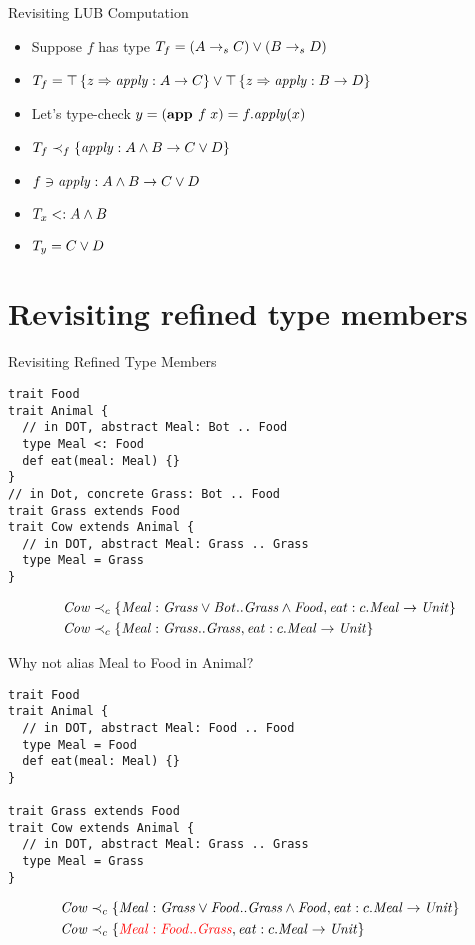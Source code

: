 \documentclass{beamer}
\begin{document}
\begin{frame}[fragile]{Revisiting LUB Computation}
\begin{itemize}
\item Suppose $f$ has type ${T_f} = {(A\rightarrow_sC)} \vee {(B\rightarrow_sD)}$
\item $T_f = {\top \left\{z \Rightarrow \mathit{apply} : A \rightarrow C \right\}} \vee {\top\left\{z \Rightarrow \mathit{apply} : B \rightarrow D \right\}}$
\item Let's type-check $y = (\textbf{app }f\;x) = f.\mathit{apply}(x)$
\item $T_f \prec_f \{\mathit{apply} : A \wedge B \rightarrow C \vee D\}$
\item $f \ni {\mathit{apply} : A \wedge B \rightarrow C \vee D}$
\item $T_x <: A \wedge B$
\item $T_y = C \vee D$
\end{itemize}
\end{frame}

\section{Revisiting refined type members}

\begin{frame}[fragile]{Revisiting Refined Type Members}
\begin{verbatim}
trait Food
trait Animal {
  // in DOT, abstract Meal: Bot .. Food
  type Meal <: Food
  def eat(meal: Meal) {}
}
// in Dot, concrete Grass: Bot .. Food
trait Grass extends Food
trait Cow extends Animal {
  // in DOT, abstract Meal: Grass .. Grass
  type Meal = Grass
}
\end{verbatim}
\begin{align*}
{\mathit{Cow}} &\prec_c \{{\mathit{Meal} : {\mathit{Grass}} \vee {\mathit{Bot}}..{\mathit{Grass}} \wedge {\mathit{Food}}}, {\mathit{eat} : c.\mathit{Meal} \rightarrow \mathit{Unit}}\}\\
{\mathit{Cow}} &\prec_c \{{\mathit{Meal} : {\mathit{Grass}}..{\mathit{Grass}}}, {\mathit{eat} : c.\mathit{Meal} \rightarrow \mathit{Unit}}\}
\end{align*}
\end{frame}

\begin{frame}[fragile]{Why not alias Meal to Food in Animal?}
\begin{verbatim}
trait Food
trait Animal {
  // in DOT, abstract Meal: Food .. Food
  type Meal = Food
  def eat(meal: Meal) {}
}

trait Grass extends Food
trait Cow extends Animal {
  // in DOT, abstract Meal: Grass .. Grass
  type Meal = Grass
}
\end{verbatim}
\begin{align*}
{\mathit{Cow}} &\prec_c \{{\mathit{Meal} : {\mathit{Grass}} \vee {\mathit{Food}}..{\mathit{Grass}} \wedge {\mathit{Food}}}, {\mathit{eat} : c.\mathit{Meal} \rightarrow \mathit{Unit}}\}\\
{\mathit{Cow}} &\prec_c \{{\color{red}{\mathit{Meal} : {\mathit{Food}}..{\mathit{Grass}}}}, {\mathit{eat} : c.\mathit{Meal} \rightarrow \mathit{Unit}}\}
\end{align*}
\end{frame}
\end{document}
